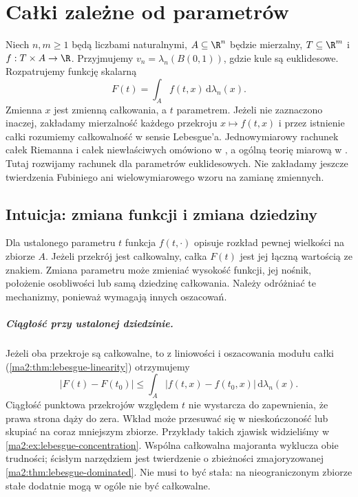 \chapter{Całki zależne od parametrów}
\label{ma2:ch:parameter-integrals}

Niech $n,m\ge1$ będą liczbami naturalnymi,
$A\subseteq\R^n$ będzie mierzalny,
$T\subseteq\R^m$ i $f:T\times A\to\R$.
Przyjmujemy $v_n=\lambda_n(B(0,1))$, gdzie kule
są euklidesowe.
Rozpatrujemy funkcję skalarną
\[
 F(t)=\int_A f(t,x)\,\mathrm d\lambda_n(x).
\]
Zmienna $x$ jest zmienną całkowania, a $t$ parametrem.
Jeżeli nie zaznaczono inaczej, zakładamy mierzalność
każdego przekroju $x\mapsto f(t,x)$ i przez istnienie
całki rozumiemy całkowalność w sensie Lebesgue'a.
Jednowymiarowy rachunek całek Riemanna i całek
niewłaściwych omówiono w
,
a ogólną teorię miarową w
.
Tutaj rozwijamy rachunek dla parametrów euklidesowych.
Nie zakładamy jeszcze twierdzenia Fubiniego ani
wielowymiarowego wzoru na zamianę zmiennych.

\section{Intuicja: zmiana funkcji i zmiana dziedziny}

Dla ustalonego parametru $t$ funkcja
$f(t,\cdot)$ opisuje rozkład pewnej wielkości
na zbiorze $A$. Jeżeli przekrój jest całkowalny,
całka $F(t)$ jest jej łączną wartością ze znakiem. Zmiana
parametru może zmieniać wysokość funkcji,
jej nośnik, położenie osobliwości lub
samą dziedzinę całkowania. Należy odróżniać
te mechanizmy, ponieważ wymagają innych
oszacowań.

\paragraph{Ciągłość przy ustalonej dziedzinie.}
Jeżeli oba przekroje są całkowalne, to
z liniowości i oszacowania modułu całki
(\ref{ma2:thm:lebesgue-linearity}) otrzymujemy
\[
 |F(t)-F(t_0)|\le
 \int_A |f(t,x)-f(t_0,x)|\,\mathrm d\lambda_n(x).
\]
Ciągłość punktowa przekrojów względem
$t$ nie wystarcza do zapewnienia, że
prawa strona dąży do zera. Wkład może
przesuwać się w nieskończoność lub
skupiać na coraz mniejszym zbiorze.
Przykłady takich zjawisk widzieliśmy
w \ref{ma2:ex:lebesgue-concentration}.
Wspólna całkowalna majoranta wyklucza
obie trudności; ścisłym narzędziem jest
twierdzenie o zbieżności zmajoryzowanej
\ref{ma2:thm:lebesgue-dominated}.
Nie musi to być stała: na nieograniczonym
zbiorze stałe dodatnie mogą w ogóle
nie być całkowalne.

